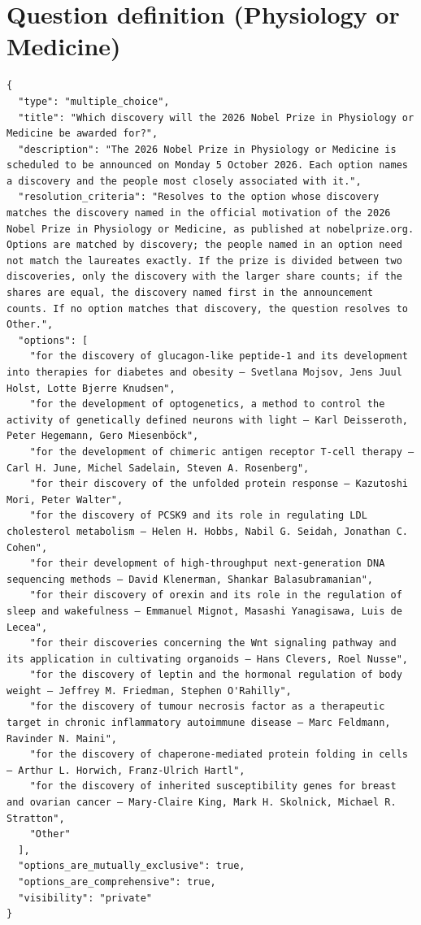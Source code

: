 \documentclass[11pt]{article}
\begin{document}
\section{Question definition (Physiology or Medicine)}\label{app:question}
\begin{Verbatim}
{
  "type": "multiple_choice",
  "title": "Which discovery will the 2026 Nobel Prize in Physiology or Medicine be awarded for?",
  "description": "The 2026 Nobel Prize in Physiology or Medicine is scheduled to be announced on Monday 5 October 2026. Each option names a discovery and the people most closely associated with it.",
  "resolution_criteria": "Resolves to the option whose discovery matches the discovery named in the official motivation of the 2026 Nobel Prize in Physiology or Medicine, as published at nobelprize.org. Options are matched by discovery; the people named in an option need not match the laureates exactly. If the prize is divided between two discoveries, only the discovery with the larger share counts; if the shares are equal, the discovery named first in the announcement counts. If no option matches that discovery, the question resolves to Other.",
  "options": [
    "for the discovery of glucagon-like peptide-1 and its development into therapies for diabetes and obesity — Svetlana Mojsov, Jens Juul Holst, Lotte Bjerre Knudsen",
    "for the development of optogenetics, a method to control the activity of genetically defined neurons with light — Karl Deisseroth, Peter Hegemann, Gero Miesenböck",
    "for the development of chimeric antigen receptor T-cell therapy — Carl H. June, Michel Sadelain, Steven A. Rosenberg",
    "for their discovery of the unfolded protein response — Kazutoshi Mori, Peter Walter",
    "for the discovery of PCSK9 and its role in regulating LDL cholesterol metabolism — Helen H. Hobbs, Nabil G. Seidah, Jonathan C. Cohen",
    "for their development of high-throughput next-generation DNA sequencing methods — David Klenerman, Shankar Balasubramanian",
    "for their discovery of orexin and its role in the regulation of sleep and wakefulness — Emmanuel Mignot, Masashi Yanagisawa, Luis de Lecea",
    "for their discoveries concerning the Wnt signaling pathway and its application in cultivating organoids — Hans Clevers, Roel Nusse",
    "for the discovery of leptin and the hormonal regulation of body weight — Jeffrey M. Friedman, Stephen O'Rahilly",
    "for the discovery of tumour necrosis factor as a therapeutic target in chronic inflammatory autoimmune disease — Marc Feldmann, Ravinder N. Maini",
    "for the discovery of chaperone-mediated protein folding in cells — Arthur L. Horwich, Franz-Ulrich Hartl",
    "for the discovery of inherited susceptibility genes for breast and ovarian cancer — Mary-Claire King, Mark H. Skolnick, Michael R. Stratton",
    "Other"
  ],
  "options_are_mutually_exclusive": true,
  "options_are_comprehensive": true,
  "visibility": "private"
}
\end{Verbatim}
\end{document}
